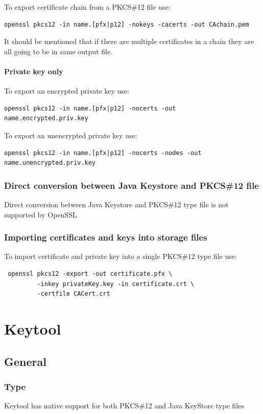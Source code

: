 \documentclass[10pt, a4paper]{report}
\begin{document}
    To export certificate chain from a PKCS\#12 file use:
\begin{verbatim}
openssl pkcs12 -in name.[pfx|p12] -nokeys -cacerts -out CAchain.pem
\end{verbatim}
    It should be mentioned that if there are multiple certificates in a chain they are all going to be in same output file.

    \subsubsection{Private key only}
    To export an encrypted private key use:
\begin{verbatim}
openssl pkcs12 -in name.[pfx|p12] -nocerts -out name.encrypted.priv.key
\end{verbatim}

    To export an unencrypted private key use:
\begin{verbatim}
openssl pkcs12 -in name.[pfx|p12] -nocerts -nodes -out name.unencrypted.priv.key
\end{verbatim}


  \subsection{Direct conversion between Java Keystore and PKCS\#12 file}
Direct conversion between Java Keystore and PKCS\#12 type file is not supported by OpenSSL 
  \subsection{Importing certificates and keys into storage files}
To import certificate and private key into a single PKCS\#12 type file use:
\begin{verbatim}
 openssl pkcs12 -export -out certificate.pfx \
         -inkey privateKey.key -in certificate.crt \
         -certfile CACert.crt
\end{verbatim}


\chapter{Keytool}

\section{General}

  \subsection{Type}
Keytool has native support for both PKCS\#12 and Java KeyStore type files 
\end{document}
